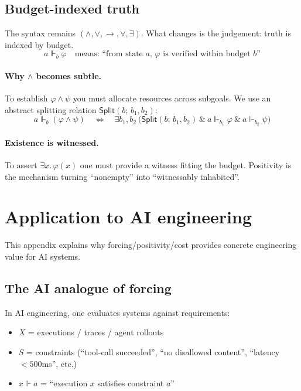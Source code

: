\documentclass[11pt]{article}
\theoremstyle{definition}
\theoremstyle{plain}
\newcommand{\forces}{\Vdash}
\newcommand{\Split}{\mathsf{Split}}
\begin{document}
\subsection{Budget-indexed truth}

The syntax remains $(\wedge,\vee,\to,\forall,\exists)$.
What changes is the judgement: truth is indexed by budget.
\[
a \Vdash_b \varphi \quad\text{means: ``from state $a$, $\varphi$ is verified within budget $b$''}
\]

\paragraph{Why $\wedge$ becomes subtle.}
To establish $\varphi\wedge\psi$ you must allocate resources across subgoals.
We use an abstract splitting relation $\Split(b;\,b_1,b_2)$:
\[
a\Vdash_b(\varphi\wedge\psi)\quad\Longleftrightarrow\quad
\exists b_1,b_2\ \bigl(\Split(b;\,b_1,b_2)\ \&\ a\Vdash_{b_1}\varphi\ \&\ a\Vdash_{b_2}\psi\bigr)
\]

\paragraph{Existence is witnessed.}
To assert $\exists x.\,\varphi(x)$ one must provide a witness fitting the budget.
Positivity is the mechanism turning ``nonempty'' into ``witnessably inhabited''.

\appendix
\section{Application to AI engineering}

This appendix explains why forcing/positivity/cost provides concrete engineering value for AI systems.

\subsection{The AI analogue of forcing}

In AI engineering, one evaluates systems against requirements:
\begin{itemize}
\item $X$ = executions / traces / agent rollouts
\item $S$ = constraints (``tool-call succeeded'', ``no disallowed content'', ``latency $<500$ms'', etc.)
\item $x\forces a$ = ``execution $x$ satisfies constraint $a$''
\end{itemize}
\end{document}
